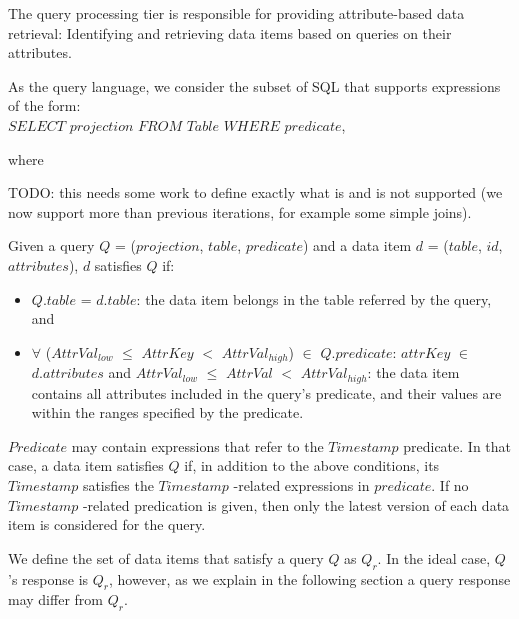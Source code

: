 The query processing tier is responsible for providing attribute-based data retrieval:
Identifying and retrieving data items based on queries on their attributes.

As the query language, we consider the subset of SQL that supports expressions of the form: \\

\noindent
$SELECT$ $projection$ $FROM$ $Table$ $WHERE$ $predicate$,

\noindent
where

TODO: this needs some work to define exactly what is and is not supported (we now support more than previous iterations, for example some simple joins).

Given a query $Q$ = ($projection$, $table$, $predicate$)
and a data item $d$ = ($table$, $id$, $attributes$), $d$ satisfies $Q$ if:
\begin{itemize}
  \item $Q.table$ = $d.table$: the data item belongs in the table referred by the query, and
  \item $\forall$ ($AttrVal_{low}$ $\leq$ $AttrKey$ $<$ $AttrVal_{high}$) $\in$ $Q.predicate$:
  $attrKey$ $\in$ $d.attributes$ and $AttrVal_{low}$ $\leq$ $AttrVal$ $<$ $AttrVal_{high}$:
  the data item contains all attributes included in the query's predicate, and their values are within the ranges
  specified by the predicate.
\end{itemize}

$Predicate$ may contain expressions that refer to the $Timestamp$ predicate.
In that case, a data item satisfies $Q$ if, in addition to the above conditions, its $Timestamp$ satisfies the
$Timestamp$ -related expressions in $predicate$.
If no $Timestamp$ -related predication is given, then only the latest version of each data item is considered for the
query.

We define the set of data items that satisfy a query $Q$ as $Q_r$.
In the ideal case, $Q$'s response is $Q_r$, however, as we explain in the following section a query response may
differ from $Q_r$. \\

